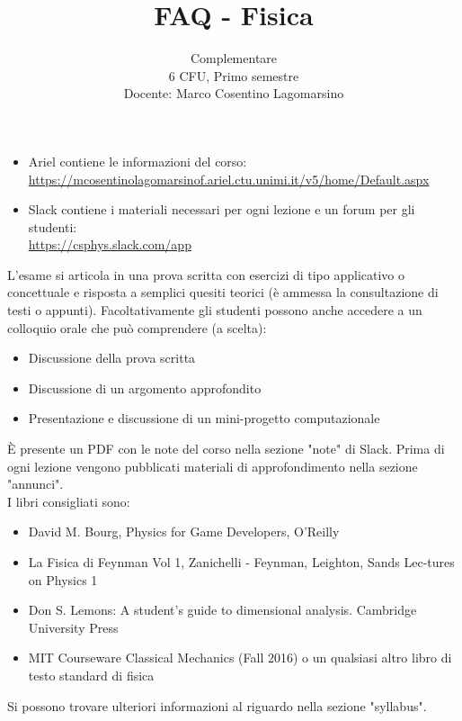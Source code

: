 \documentclass{article}
\title{FAQ - \textbf{Fisica}}
\author{
	Complementare\\6 CFU, Primo semestre\\
	Docente: Marco Cosentino Lagomarsino\\ 
	\date{}
}
\begin{document}
 
	\maketitle
	
	\begin{QuestionList}
		
		 {
			\begin{itemize}
				
		    \item Ariel contiene le informazioni del corso:\\
		    \href{https://mcosentinolagomarsinof.ariel.ctu.unimi.it/v5/home/Default.aspx}{https://mcosentinolagomarsinof.ariel.ctu.unimi.it/v5/home/Default.aspx}\\
		    
		    \item Slack contiene i materiali necessari per ogni lezione e un forum per gli studenti:\\
		    \href{https://csphys.slack.com/app}{https://csphys.slack.com/app}
		    
		    \end{itemize}
		}
		
		
		 {
			L'esame si articola in una prova scritta con esercizi di tipo applicativo o concettuale e risposta a semplici quesiti teorici (è ammessa la consultazione di testi o appunti).
			Facoltativamente gli studenti possono anche accedere a un colloquio orale che può comprendere (a scelta): 
			\begin{itemize}
			\item Discussione della prova scritta 
			\item Discussione di un argomento approfondito 
			\item Presentazione e discussione di un mini-progetto computazionale 
			\end{itemize}
		}
		
		 {
			È presente un PDF con le note del corso nella sezione "note" di Slack. Prima di ogni lezione vengono pubblicati materiali di approfondimento nella sezione "annunci". \\
			I libri consigliati sono:
			\begin{itemize}
			\item David M. Bourg, Physics for Game Developers, O’Reilly
			\item La Fisica di Feynman Vol 1, Zanichelli - Feynman, Leighton, Sands Lec-tures on Physics 1
			\item Don S. Lemons: A student’s guide to dimensional analysis. Cambridge
			University Press
			\item MIT Courseware Classical Mechanics (Fall 2016) o un qualsiasi altro libro di testo standard di fisica
			\end{itemize}
			Si possono trovare ulteriori informazioni al riguardo nella sezione "syllabus".
		}
	
		
	\end{QuestionList}
	
\end{document}

